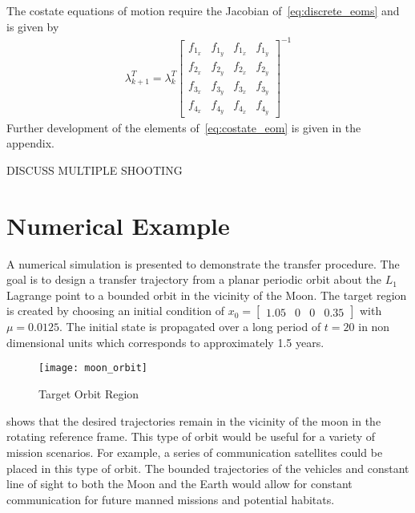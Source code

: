 \documentclass[letterpaper, preprint, paper,11pt]{AAS}	%
\begin{document}
The costate equations of motion require the Jacobian of~\cref{eq:discrete_eoms} and is given by
\begin{align}\label{eq:costate_eom}
	\lambda_{k+1}^T = \lambda_k^T
	\begin{bmatrix} 
		f_{1_x} & f_{1_y} & f_{1_{\dot{x}}} & f_{1_{\dot{y}}} \\
		f_{2_x} & f_{2_y} & f_{2_{\dot{x}}} & f_{2_{\dot{y}}} \\
		f_{3_x} & f_{3_y} & f_{3_{\dot{x}}} & f_{3_{\dot{y}}} \\
		f_{4_x} & f_{4_y} & f_{4_{\dot{x}}} & f_{4_{\dot{y}}}
	\end{bmatrix} ^ {-1}
\end{align}
Further development of the elements of~\cref{eq:costate_eom} is given in the appendix.

{\Large DISCUSS MULTIPLE SHOOTING}

\section{Numerical Example}\label{sec:simulation}
A numerical simulation is presented to demonstrate the transfer procedure.
The goal is to design a transfer trajectory from a planar periodic orbit about the \( L_1\) Lagrange point to a bounded orbit in the vicinity of the Moon.
The target region is created by choosing an initial condition of \( x_0 = \begin{bmatrix}1.05 & 0 & 0 & 0.35 \end{bmatrix} \) with \( \mu = 0.0125 \).
The initial state is propagated over a long period of \( t = \num{20} \) in non dimensional units which corresponds to approximately \num{1.5} years.
\begin{figure}[htbp]
   \centering
   \texttt{[image: moon\_orbit]} %
   \caption{Target Orbit Region}
   \label{fig:moon_orbit}
\end{figure}
 shows that the desired trajectories remain in the vicinity of the moon in the rotating reference frame. 
This type of orbit would be useful for a variety of mission scenarios.
For example, a series of communication satellites could be placed in this type of orbit. 
The bounded trajectories of the vehicles and constant line of sight to both the Moon and the Earth would allow for constant communication for future manned missions and potential habitats.
\end{document}
